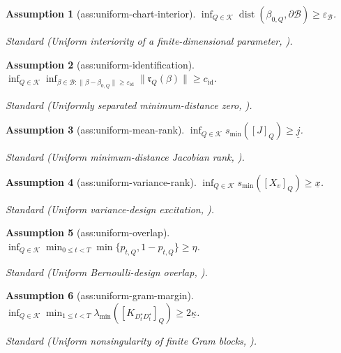 \documentclass{article}
\newtheorem{assumption}{Assumption}
\begin{document}
\begin{assumption}[ass:uniform-chart-interior]\label{ass:uniform-chart-interior}
\(\inf_{Q\in\mathcal K}\operatorname{dist}(\beta_{0,Q},\partial\mathcal B)\ge\varepsilon_{\mathcal B}\).
\par\smallskip\noindent\emph{Standard} (Uniform interiority of a finite-dimensional parameter, \cite{NeweyMcFadden1994LargeSample}).
\end{assumption}

\begin{assumption}[ass:uniform-identification]\label{ass:uniform-identification}
\(\inf_{Q\in\mathcal K}\inf_{\beta\in\mathcal B:\|\beta-\beta_{0,Q}\|\ge\varepsilon_{\mathrm{id}}}\|\mathfrak r_Q(\beta)\|\ge c_{\mathrm{id}}\).
\par\smallskip\noindent\emph{Standard} (Uniformly separated minimum-distance zero, \cite{NeweyMcFadden1994LargeSample}).
\end{assumption}

\begin{assumption}[ass:uniform-mean-rank]\label{ass:uniform-mean-rank}
\(\inf_{Q\in\mathcal K}s_{\min}([J]_Q)\ge\underline j\).
\par\smallskip\noindent\emph{Standard} (Uniform minimum-distance Jacobian rank, \cite{NeweyMcFadden1994LargeSample}).
\end{assumption}

\begin{assumption}[ass:uniform-variance-rank]\label{ass:uniform-variance-rank}
\(\inf_{Q\in\mathcal K}s_{\min}([X_v]_Q)\ge\underline x\).
\par\smallskip\noindent\emph{Standard} (Uniform variance-design excitation, \cite{NeweyMcFadden1994LargeSample}).
\end{assumption}

\begin{assumption}[ass:uniform-overlap]\label{ass:uniform-overlap}
\(\inf_{Q\in\mathcal K}\min_{0\le t<T}\min\{p_{t,Q},1-p_{t,Q}\}\ge\eta\).
\par\smallskip\noindent\emph{Standard} (Uniform Bernoulli-design overlap, \cite{ShiraniBayati2024CausalMP}).
\end{assumption}

\begin{assumption}[ass:uniform-gram-margin]\label{ass:uniform-gram-margin}
\(\inf_{Q\in\mathcal K}\min_{1\le t<T}\lambda_{\min}([K_{D_t^{\star}D_t^{\star}}]_Q)\ge2\underline\kappa\).
\par\smallskip\noindent\emph{Standard} (Uniform nonsingularity of finite Gram blocks, \cite{NeweyMcFadden1994LargeSample}).
\end{assumption}
\end{document}
